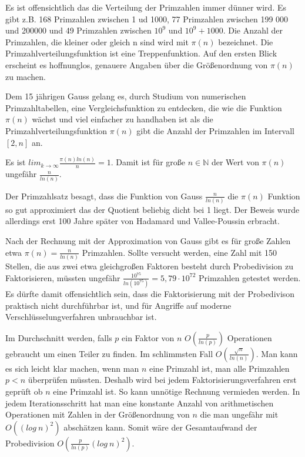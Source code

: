 \documentclass[10pt, bigheadings]{scrartcl}
\begin{document}
Es ist offensichtlich das die Verteilung  der Primzahlen immer dünner
wird. Es gibt z.B. 168 Primzahlen zwischen 1 ud 1000, 77 Primzahlen
zwischen 199 000 und 200000  und 49 Primzahlen zwischen $10^9$ und
$10^9+1000$. Die Anzahl der Primzahlen, die kleiner oder gleich n sind
wird mit $\pi(n)$ bezeichnet. Die Primzahlverteilungsfunktion ist eine
Treppenfunktion.  Auf den ersten Blick erscheint es hoffnunglos, genauere
Angaben über die Größenordnung von $\pi(n)$ zu machen.

Dem 15 jährigen Gauss gelang es, durch Studium von numerischen
Primzahltabellen, eine Vergleichsfunktion zu entdecken, die wie die
Funktion $\pi(n)$ wächst und viel einfacher zu handhaben ist als die
Primzahlverteilungsfunktion $\pi(n)$ gibt die Anzahl der Primzahlen im
Intervall $[2,n] $ an.
\begin{center}
Es ist $lim_{k\rightarrow\infty} \frac{\pi(n)ln(n)}{n} = 1$. Damit
ist für große $n \in {\mathbb N}$ der Wert von $\pi(n)$ ungefähr
$\frac{n}{ln(n)}$.
\end{center}
Der Primzahlsatz besagt, dass die Funktion von Gauss $\frac{n}{ln(n)}$
die $\pi(n)$ Funktion so gut approximiert das der Quotient beliebig
dicht bei 1 liegt. Der Beweis wurde allerdings erst 100 Jahre später
von Hadamard und Vallee-Poussin erbracht.

Nach der Rechnung mit der Approximation von Gauss gibt es für große Zahlen
etwa $\pi(n) = \frac{n}{ln(n)}$ Primzahlen. Sollte versucht werden,
eine Zahl mit 150 Stellen, die  aus zwei  etwa gleichgroßen Faktoren
besteht durch Probedivision zu  Faktorisieren, müssten ungefähr
$\frac{10^75}{ln(10^75)}=5,79\cdot10^{72}$ Primzahlen getestet werden.
Es dürfte damit offensichtlich sein, dass die Faktorisierung mit der
Probedivison praktisch nicht durchführbar ist, und für Angriffe auf moderne
Verschlüsselungverfahren unbrauchbar ist.

Im Durchschnitt werden, falls $p$ ein Faktor von $n$ $O(\frac{p}{ln(p)})$ Operationen
gebraucht um einen Teiler zu finden. Im schlimmsten Fall $O(\frac{\sqrt{n}}{ln(n)})$.
Man kann es sich leicht klar machen, wenn man $n$ eine Primzahl ist, man
alle Primzahlen $p<n$ überprüfen müssten. Deshalb wird bei jedem
Faktorisierungsverfahren erst geprüft ob $n$ eine Primzahl ist. So
kann unnötige Rechnung vermieden werden. In jedem Iterationsschritt
hat man eine konstante Anzahl von arithmetischen Operationen mit Zahlen
in der Größenordnung von $n$ die man ungefähr mit $O((log\ n)^2)$
abschätzen kann. Somit wäre der Gesamtaufwand der
Probedivision $O(\frac{p}{ln(p)}(log\ n)^2)$.
\end{document}
